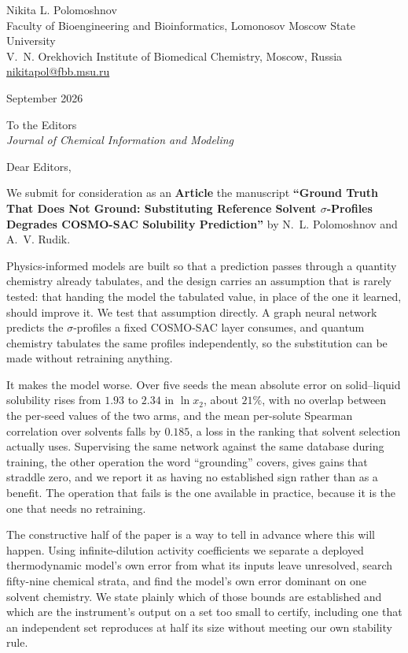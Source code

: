 \documentclass[11pt]{article}
\begin{document}
\noindent
{\large Nikita L. Polomoshnov}\\[2pt]
Faculty of Bioengineering and Bioinformatics, Lomonosov Moscow State University\\
V.~N. Orekhovich Institute of Biomedical Chemistry, Moscow, Russia\\
\href{mailto:nikitapol@fbb.msu.ru}{nikitapol@fbb.msu.ru}

\vspace{4mm}
 September 2026

\vspace{4mm}
\noindent
To the Editors\\
\emph{Journal of Chemical Information and Modeling}

\vspace{4mm}
\noindent Dear Editors,

We submit for consideration as an \textbf{Article} the manuscript \textbf{``Ground Truth That Does
Not Ground: Substituting Reference Solvent $\sigma$-Profiles Degrades COSMO-SAC Solubility
Prediction''} by N.~L. Polomoshnov and A.~V. Rudik.

Physics-informed models are built so that a prediction passes through a quantity chemistry already
tabulates, and the design carries an assumption that is rarely tested: that handing the model the
tabulated value, in place of the one it learned, should improve it. We test that assumption
directly. A graph neural network predicts the $\sigma$-profiles a fixed COSMO-SAC layer consumes,
and quantum chemistry tabulates the same profiles independently, so the substitution can be made
without retraining anything.

It makes the model worse. Over five seeds the mean absolute error on solid--liquid solubility rises
from $1.93$ to $2.34$ in $\ln x_2$, about $21\%$, with no overlap between the per-seed values of the
two arms, and the mean per-solute Spearman correlation over solvents falls by $0.185$, a loss in the
ranking that solvent selection actually uses. Supervising the same network against the same
database during training, the other operation the word ``grounding'' covers, gives gains that
straddle zero, and we report it as having no established sign rather than as a benefit. The
operation that fails is the one available in practice, because it is the one that needs no
retraining.

The constructive half of the paper is a way to tell in advance where this will happen. Using
infinite-dilution activity coefficients we separate a deployed thermodynamic model's own error from
what its inputs leave unresolved, search fifty-nine chemical strata, and find the model's own error
dominant on one solvent chemistry. We state plainly which of those bounds are established and which
are the instrument's output on a set too small to certify, including one that an independent set
reproduces at half its size without meeting our own stability rule.
\end{document}
